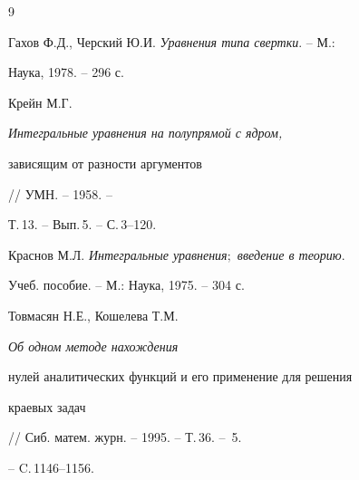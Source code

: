 \begin{thebibliography}{9}







Гахов Ф.Д., Черский Ю.И. {\em Уравнения типа свертки}. -- М.:


Наука, 1978. -- 296 с.




Крейн М.Г. {\em Интегральные уравнения на полупрямой с ядром,


зависящим от разности аргументов} // УМН. -- 1958. --


Т.\,13. -- Вып.\,5. -- С.\,3--120.




Краснов М.Л. {\em Интегральные уравнения$;$ введение в теорию}.


Учеб. пособие. -- М.: Наука, 1975. -- 304 с.




Товмасян Н.Е., Кошелева Т.М. {\em Об одном методе нахождения


нулей аналитических функций и его применение для решения


краевых задач} // Сиб. матем. журн. -- 1995. -- Т.\,36. -- \No\,5.


-- C.\,1146--1156.





\end{thebibliography}





\vskip 1cm














\label{end}





